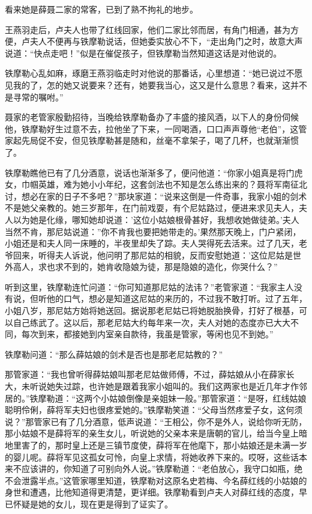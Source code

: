 \documentclass[12pt,oneside]{book}
\begin{document}
看来她是薛聂二家的常客，已到了熟不拘礼的地步。

王燕羽走后，卢夫人也带了红线回家，他们二家比邻而居，有角门相通，甚为方便，卢夫人不便再与铁摩勒说话，但她委实放心不下，``走出角门之时，故意大声说道：``快点走吧！''似是在催促孩子，但铁摩勒当然知道这话是对他说的。

铁摩勒心乱如麻，琢磨王燕羽临走时对他说的那番话，心里想道：``她已说过不愿见我的了，怎的她又说要来？还有，她要我当心，这又是什么意思？看来，这并不是寻常的嘱咐。''

聂家的老管家殷勤招待，当晚给铁摩勒备办了丰盛的接风酒，以下人的身份伺候他，铁摩勒好生过意不去，拉他坐了下来，一同喝酒，口口声声尊他``老伯''，这管家起先局促不安，但见铁摩勒甚是随和，丝毫不拿架子，喝了几杯，也就渐渐惯了。

铁摩勒瞧他已有了几分酒意，说话也渐渐多了，便问他道：``你家小姐真是将门虎女，巾帼英雄，难为她小小年纪，这套剑法也不知是怎么练出来的？聂将军南征北讨，想必在家的日子不多吧？''那块家道：``说来这倒是一件奇事，我家小姐的剑术不是她父亲教的。她三岁那年，在门前戏耍，有个尼姑路过，便进来求见夫人，夫人以为她是化缘，哪知她却说道：'这位小姑娘根骨甚好，我想收她做徒弟。'夫人当然不肯，那尼姑说道：''你不肯我也要把她带走的。'果然那天晚上，门户紧闭，小姐还是和夫人同一床睡的，半夜里却失了踪。夫人哭得死去活来。过了几天，老爷回来，听得夫人诉说，他问明了那尼姑的相貌，反而安慰她道：'这位尼姑是世外高人，求也求不到的，她肯收隐娘为徒，那是隐娘的造化，你哭什么？''

听到这里，铁摩勒连忙问道：``你可知道那尼姑的法讳？''老管家道：``我家主人没有说，但听他的口气，想必是知道这尼姑的来历的，不过我不敢打听。过了五年，小姐八岁，那尼姑方始将她送回。据说那老尼姑已将她脱胎换骨，打好了根基，可以自己练武了。这以后，那老尼姑大约每年来一次，夫人对她的态度亦已大大不同，每次到来，都接她到内室亲自款待，我虽是管家，等闲也见不到她。''

铁摩勒问道：``那么薛姑娘的剑术是否也是那老尼姑教的？''

那管家道：``我也曾听得薛姑娘叫那老尼姑做师傅，不过，薛姑娘从小在薛家长大，未听说她失过踪，也许她是跟着我家小姐叫的。我们这两家也是近几年才作邻居的。''铁摩勒道：``这两个小姑娘倒像是亲姐妹一般。''那管家道：``是呀，红线姑娘聪明伶俐，薛将军夫妇也很疼爱她的。''铁摩勒笑道：``父母当然疼爱子女，这何须说？''那管家已有了几分酒意，低声说道：``王相公，你不是外人，说给你听无防，那小姑娘不是薛将军的亲生女儿，听说她的父亲本来是唐朝的官儿，给当今皇上暗地里害了的，那时皇上还是三镇节度使，薛将军在他麾下，那小姑娘还是未满一岁的婴儿呢。薛将军见这孤女可怜，向皇上求情，将她收养下来的。哎呀，这些话本来不应该讲的，你知道了可别向外人说。''铁摩勒道：``老伯放心，我守口如瓶，绝不会泄露半点。''这管家哪里知道，铁摩勒对这原名史若梅、今名薛红线的小姑娘的身世和遭遇，比他知道得更清楚，更详细。铁摩勒看到卢夫人对薛红线的态度，早已怀疑是她的女儿，现在更是得到了证实了。
\end{document}
